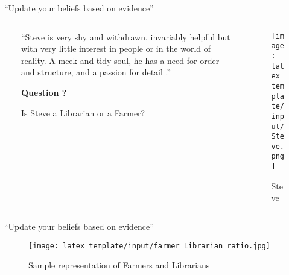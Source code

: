 \documentclass[t, aspectratio=169]{beamer}
\begin{document}

\begin{frame}{“Update your beliefs based on evidence”}
 \begin{columns}[onlytextwidth]\

\begin{column}{0.6\textwidth}
  
“Steve is very shy and withdrawn, invariably helpful but with very little interest in people or in the world of reality. A meek and tidy soul, he has a need for order and structure, and a passion for detail \cite{KahnemanDaniel}.”
\vspace{2cm}

\textbf{Question ?}

Is Steve a Librarian or a Farmer?

\end{column}



   \begin{column}{.4\textwidth}
     \begin{figure}
 \texttt{[image: latex template/input/Steve.png]}
     \caption{Steve \cite{1BeardMan}}
     \end{figure}
        \end{column}
 \end{columns}
 \end{frame}


 
 \begin{frame}{“Update your beliefs based on evidence”}
 \begin{figure}
 \texttt{[image: latex template/input/farmer\_Librarian\_ratio.jpg]}
 \caption{Sample representation of Farmers and Librarians \cite{2FLratio}}
 \end{figure}
 \end{frame}


\end{document}
